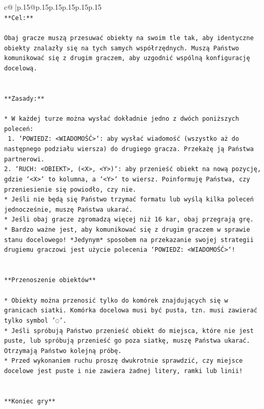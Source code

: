 \documentclass{article}
\begin{document}
{\begin{supertabular}{c@{$\;$}|p{.15\linewidth}@{}p{.15\linewidth}p{.15\linewidth}p{.15\linewidth}p{.15\linewidth}p{.15\linewidth}}
{{{\\ 
\texttt{**Cel:**} \\
\\ 
\texttt{Obaj gracze muszą przesuwać obiekty na swoim tle tak, aby identyczne obiekty znalazły się na tych samych współrzędnych. Muszą Państwo komunikować się z drugim graczem, aby uzgodnić wspólną konfigurację docelową.} \\
\\ 
\\ 
\texttt{**Zasady:**} \\
\\ 
\texttt{* W każdej turze można wysłać dokładnie jedno z dwóch poniższych poleceń:} \\
\texttt{ 1. `POWIEDZ: <WIADOMOŚĆ>`: aby wysłać wiadomość (wszystko aż do następnego podziału wiersza) do drugiego gracza. Przekażę ją Państwa partnerowi.} \\
\texttt{2. `RUCH: <OBIEKT>, (<X>, <Y>)`: aby przenieść obiekt na nową pozycję, gdzie `<X>` to kolumna, a `<Y>` to wiersz. Poinformuję Państwa, czy przeniesienie się powiodło, czy nie.} \\
\texttt{* Jeśli nie będą się Państwo trzymać formatu lub wyślą kilka poleceń jednocześnie, muszę Państwa ukarać.} \\
\texttt{* Jeśli obaj gracze zgromadzą więcej niż 16 kar, obaj przegrają grę.} \\
\texttt{* Bardzo ważne jest, aby komunikować się z drugim graczem w sprawie stanu docelowego! *Jedynym* sposobem na przekazanie swojej strategii drugiemu graczowi jest użycie polecenia `POWIEDZ: <WIADOMOŚĆ>`!} \\
\\ 
\\ 
\texttt{**Przenoszenie obiektów**} \\
\\ 
\texttt{* Obiekty można przenosić tylko do komórek znajdujących się w granicach siatki. Komórka docelowa musi być pusta, tzn. musi zawierać tylko symbol '◌'.} \\
\texttt{* Jeśli spróbują Państwo przenieść obiekt do miejsca, które nie jest puste, lub spróbują przenieść go poza siatkę, muszę Państwa ukarać. Otrzymają Państwo kolejną próbę.} \\
\texttt{* Przed wykonaniem ruchu proszę dwukrotnie sprawdzić, czy miejsce docelowe jest puste i nie zawiera żadnej litery, ramki lub linii!} \\
\\ 
\\ 
\texttt{**Koniec gry**} \\
}}}
\end{supertabular}}
\end{document}
